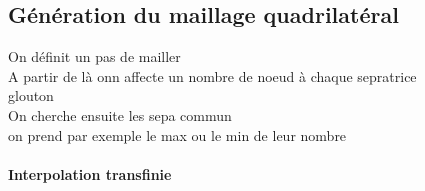 \subsection{Génération du maillage quadrilatéral}
\label{subsec:gen_mesh_quad}

On définit un pas de mailler\\
A partir de là onn affecte un nombre de noeud à chaque sepratrice\\
glouton\\
On cherche ensuite les sepa commun\\
on prend par exemple le max ou le min de leur nombre\\

\paragraph{Interpolation transfinie}

